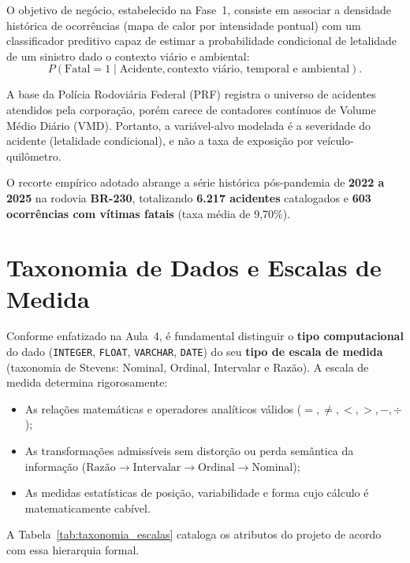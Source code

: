 \documentclass[11pt,a4paper]{article}
\begin{document}
O objetivo de negócio, estabelecido na Fase~1, consiste em associar a densidade histórica de ocorrências (mapa de calor por intensidade pontual) com um classificador preditivo capaz de estimar a probabilidade condicional de letalidade de um sinistro dado o contexto viário e ambiental:
\[
P(\text{Fatal} = 1 \mid \text{Acidente}, \text{contexto viário, temporal e ambiental}).
\]

A base da Polícia Rodoviária Federal (PRF) registra o universo de acidentes atendidos pela corporação, porém carece de contadores contínuos de Volume Médio Diário (VMD). Portanto, a variável-alvo modelada é a severidade do acidente (letalidade condicional), e não a taxa de exposição por veículo-quilômetro.

O recorte empírico adotado abrange a série histórica pós-pandemia de \textbf{2022 a 2025} na rodovia \textbf{BR-230}, totalizando \textbf{6.217 acidentes} catalogados e \textbf{603 ocorrências com vítimas fatais} (taxa média de 9,70\%).

\section{Taxonomia de Dados e Escalas de Medida}

Conforme enfatizado na Aula~4, é fundamental distinguir o \textbf{tipo computacional} do dado (\texttt{INTEGER}, \texttt{FLOAT}, \texttt{VARCHAR}, \texttt{DATE}) do seu \textbf{tipo de escala de medida} (taxonomia de Stevens: Nominal, Ordinal, Intervalar e Razão). A escala de medida determina rigorosamente:
\begin{itemize}
  \item As relações matemáticas e operadores analíticos válidos ($=, \neq, <, >, -, \div$);
  \item As transformações admissíveis sem distorção ou perda semântica da informação ($\text{Razão} \rightarrow \text{Intervalar} \rightarrow \text{Ordinal} \rightarrow \text{Nominal}$);
  \item As medidas estatísticas de posição, variabilidade e forma cujo cálculo é matematicamente cabível.
\end{itemize}

A Tabela~\ref{tab:taxonomia_escalas} cataloga os atributos do projeto de acordo com essa hierarquia formal.
\end{document}
